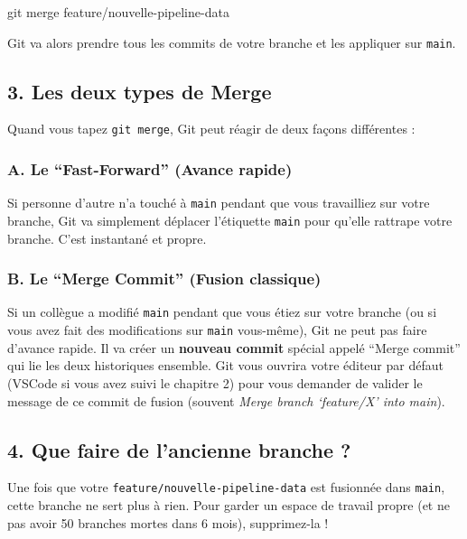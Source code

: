 \documentclass[
  letterpaper,
  DIV=11,
  numbers=noendperiod]{scrreprt}
\newenvironment{Shaded}{\begin{snugshade}}{\end{snugshade}}
\newcommand{\FunctionTok}[1]{\textcolor[rgb]{0.28,0.35,0.67}{#1}}
\newcommand{\NormalTok}[1]{\textcolor[rgb]{0.00,0.23,0.31}{#1}}
\begin{document}
\begin{Shaded}
\begin{Highlighting}[]
\FunctionTok{git}\NormalTok{ merge feature/nouvelle{-}pipeline{-}data}
\end{Highlighting}
\end{Shaded}

Git va alors prendre tous les commits de votre branche et les appliquer
sur \texttt{main}.

\subsection{3. Les deux types de Merge}\label{les-deux-types-de-merge}

Quand vous tapez \texttt{git\ merge}, Git peut réagir de deux façons
différentes :

\subsubsection{A. Le ``Fast-Forward'' (Avance
rapide)}\label{a.-le-fast-forward-avance-rapide}

Si personne d'autre n'a touché à \texttt{main} pendant que vous
travailliez sur votre branche, Git va simplement déplacer l'étiquette
\texttt{main} pour qu'elle rattrape votre branche. C'est instantané et
propre.

\subsubsection{B. Le ``Merge Commit'' (Fusion
classique)}\label{b.-le-merge-commit-fusion-classique}

Si un collègue a modifié \texttt{main} pendant que vous étiez sur votre
branche (ou si vous avez fait des modifications sur \texttt{main}
vous-même), Git ne peut pas faire d'avance rapide. Il va créer un
\textbf{nouveau commit} spécial appelé ``Merge commit'' qui lie les deux
historiques ensemble. Git vous ouvrira votre éditeur par défaut (VSCode
si vous avez suivi le chapitre 2) pour vous demander de valider le
message de ce commit de fusion (souvent \emph{Merge branch `feature/X'
into main}).

\subsection{4. Que faire de l'ancienne branche
?}\label{que-faire-de-lancienne-branche}

Une fois que votre \texttt{feature/nouvelle-pipeline-data} est fusionnée
dans \texttt{main}, cette branche ne sert plus à rien. Pour garder un
espace de travail propre (et ne pas avoir 50 branches mortes dans 6
mois), supprimez-la !
\end{document}
